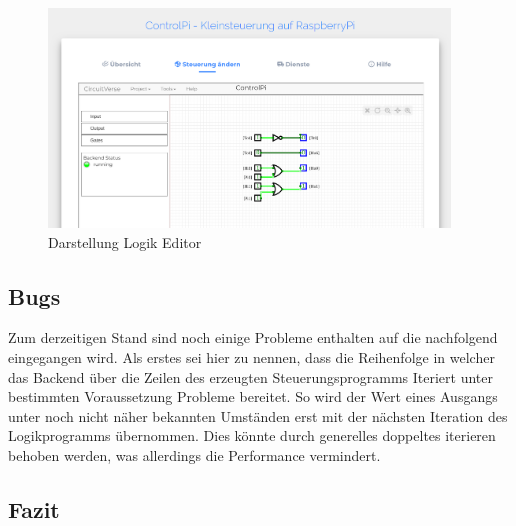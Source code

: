  \begin{figure}[H]
	\begin{center}
		\includegraphics[width=0.95\textwidth]{./images/FrontendAendern.png}
		\caption{Darstellung Logik Editor}
		\label{img:FrontendAenderung}
	\end{center} 
\end{figure}	


 \subsection{Bugs}
 Zum derzeitigen Stand sind noch einige Probleme enthalten auf die nachfolgend eingegangen wird. Als  erstes sei hier zu nennen, dass die Reihenfolge in welcher das Backend über die Zeilen des erzeugten Steuerungsprogramms Iteriert unter bestimmten Voraussetzung Probleme bereitet. So wird der Wert eines Ausgangs unter noch nicht näher bekannten Umständen erst mit der nächsten Iteration des Logikprogramms übernommen. Dies könnte durch generelles doppeltes iterieren behoben werden, was allerdings die Performance vermindert.
 
 \subsection{Fazit}
